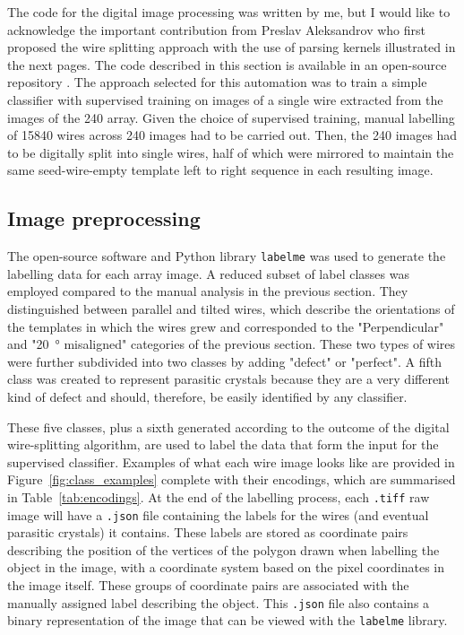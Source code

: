 The code for the digital image processing was written by me, but I would like to acknowledge the important contribution from Preslav Aleksandrov who first proposed the wire splitting approach with the use of parsing kernels illustrated in the next pages. The code described in this section is available in an open-source repository \cite{code}. The approach selected for this automation was to train a simple classifier with supervised training on images of a single wire extracted from the images of the \num{240} array. Given the choice of supervised training, manual labelling of \num{15840} wires across 240 images had to be carried out. Then, the 240 images had to be digitally split into single wires, half of which were mirrored to maintain the same seed-wire-empty template left to right sequence in each resulting image.

\subsection{Image preprocessing}

The open-source software and Python \cite{python} library \texttt{labelme} \cite{labelme2016} was used to generate the labelling data for each array image. A reduced subset of label classes was employed compared to the manual analysis in the previous section. They distinguished between parallel and tilted wires, which describe the orientations of the templates in which the wires grew and corresponded to the "Perpendicular" and "\qty{20}{\degree} misaligned" categories of the previous section. These two types of wires were further subdivided into two classes by adding "defect" or "perfect". A fifth class was created to represent parasitic crystals because they are a very different kind of defect and should, therefore, be easily identified by any classifier.

These five classes, plus a sixth generated according to the outcome of the digital wire-splitting algorithm, are used to label the data that form the input for the supervised classifier. Examples of what each wire image looks like are provided in Figure~\ref{fig:class_examples} complete with their encodings, which are summarised in Table~\ref{tab:encodings}. At the end of the labelling process, each \texttt{.tiff} raw image will have a \texttt{.json} file containing the labels for the wires (and eventual parasitic crystals) it contains. These labels are stored as coordinate pairs describing the position of the vertices of the polygon drawn when labelling the object in the image, with a coordinate system based on the pixel coordinates in the image itself. These groups of coordinate pairs are associated with the manually assigned label describing the object. This \texttt{.json} file also contains a binary representation of the image that can be viewed with the \texttt{labelme} library.

